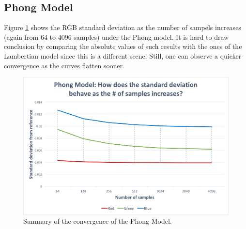 \documentclass{article}
\begin{document}
\subsection*{Phong Model}
Figure \ref{fig:phong_stdev} shows the RGB standard deviation as the number of sampels increases (again from 64 to 4096 samples) under the Phong model. It is hard to draw conclusion by comparing the absolute values of such results with the ones of the Lambertian model since this is a different scene. Still, one can observe a quicker convergence as the curves flatten sooner.
\begin{figure}[h]
\centering
\includegraphics[width=\textwidth]{assets/phong_stdev}

\caption{Summary of the convergence of the Phong Model.}
\label{fig:phong_stdev}
\end{figure}
\end{document}
